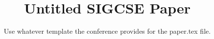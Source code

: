 \documentclass[sigconf]{acmart}
\begin{document}
\title{Untitled SIGCSE Paper}


\newcommand{\showurlx}{[redacted]}

\author{
Use whatever template the conference provides for the paper.tex file.
}



\maketitle

%
%
%
%
%


%


{\footnotesize 
}
\end{document}
